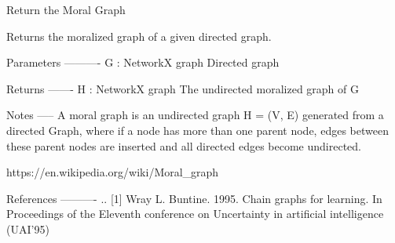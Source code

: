 \begin{DoxyVerb}Return the Moral Graph

Returns the moralized graph of a given directed graph.

Parameters
----------
G : NetworkX graph
    Directed graph

Returns
-------
H : NetworkX graph
    The undirected moralized graph of G

Notes
-----
A moral graph is an undirected graph H = (V, E) generated from a
directed Graph, where if a node has more than one parent node, edges
between these parent nodes are inserted and all directed edges become
undirected.

https://en.wikipedia.org/wiki/Moral_graph

References
----------
.. [1] Wray L. Buntine. 1995. Chain graphs for learning.
       In Proceedings of the Eleventh conference on Uncertainty
       in artificial intelligence (UAI'95)
\end{DoxyVerb}
 